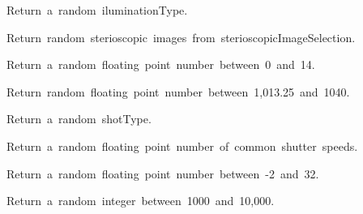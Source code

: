 \begin{longtable}[]
\begin{minipage}[t]{\linewidth}
\begin{description}
\tightlist
\item[\protect\hypertarget{-randIluminationType}{}{\textbf{randIluminationType}}()
-\textgreater{} enum.Enum]
{Return~a~random~iluminationType.}
\end{description}

\begin{description}
\tightlist
\item[\protect\hypertarget{-randImage}{}{\textbf{randImage}}()
-\textgreater{} (\textless class 'str'\textgreater, \textless class
'str'\textgreater)]
{Return~random~sterioscopic~images~from~sterioscopicImageSelection.}
\end{description}

\begin{description}
\tightlist
\item[\protect\hypertarget{-randPh}{}{\textbf{randPh}}() -\textgreater{}
float]
{Return~a~random~floating~point~number~between~0~and~14.}
\end{description}

\begin{description}
\tightlist
\item[\protect\hypertarget{-randPressure}{}{\textbf{randPressure}}()
-\textgreater{} float]
{Return~random~floating~point~number~between~1,013.25~and~1040.}
\end{description}

\begin{description}
\tightlist
\item[\protect\hypertarget{-randShotType}{}{\textbf{randShotType}}()
-\textgreater{} enum.Enum]
{Return~a~random~shotType.}
\end{description}

\begin{description}
\tightlist
\item[\protect\hypertarget{-randShutterSpeed}{}{\textbf{randShutterSpeed}}()
-\textgreater{} float]
{Return~a~random~floating~point~number~of~common~shutter~speeds.}
\end{description}

\begin{description}
\tightlist
\item[\protect\hypertarget{-randTemp}{}{\textbf{randTemp}}()
-\textgreater{} float]
{Return~a~random~floating~point~number~between~-2~and~32.}
\end{description}

\begin{description}
\tightlist
\item[\protect\hypertarget{-randWhiteBalance}{}{\textbf{randWhiteBalance}}()
-\textgreater{} int]
{Return~a~random~integer~between~1000~and~10,000.}
\end{description}
\end{minipage} \\
\bottomrule
\end{longtable}

